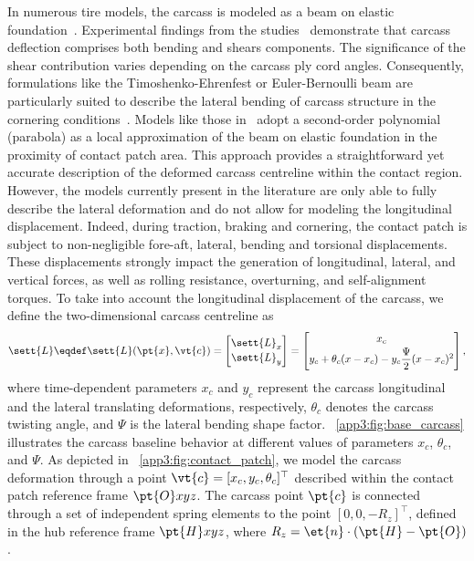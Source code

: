 In numerous tire models, the carcass is modeled as a beam on elastic foundation~\cite{dehoogh2005implementing, sarkisov2019physical, gil2020inplane, nakajima2019advanced}. Experimental findings from the studies~\cite{sarkisov2019physical, gil2020inplane} demonstrate that carcass deflection comprises both bending and shears components. The significance of the shear contribution varies depending on the carcass ply cord angles. Consequently, formulations like the Timoshenko-Ehrenfest or Euler-Bernoulli beam are particularly suited to describe the lateral bending of carcass structure in the cornering conditions~\cite{gil2020inplane}. Models like those in~\cite{fiala1954seitenkraften, miyashita2006new, kabe2006new, xu2014analytical, gil2020inplane, sakai1981theoreticalI, sakai1981theoreticalII, sakai1981theoreticalIII, sakai1982theoreticalIV, miyashita2010tire, fevrier2013method} adopt a second-order polynomial (parabola) as a local approximation of the beam on elastic foundation in the proximity of contact patch area. This approach provides a straightforward yet accurate description of the deformed carcass centreline within the contact region. However, the models currently present in the literature are only able to fully describe the lateral deformation and do not allow for modeling the longitudinal displacement. Indeed, during traction, braking and cornering, the contact patch is subject to non-negligible fore-aft, lateral, bending and torsional displacements. These displacements strongly impact the generation of longitudinal, lateral, and vertical forces, as well as rolling resistance, overturning, and self-alignment torques. To take into account the longitudinal displacement of the carcass, we define the two-dimensional carcass centreline as
%
\begin{equation}
  \sett{L} \eqdef \sett{L}(\pt{x}, \vt{c}) =
  \begin{bmatrix}
    \sett{L}_x \\[0.2em]
    \sett{L}_y
  \end{bmatrix} =
  \begin{bmatrix}
    x_c \\[0.2em]
    y_c + \theta_c(x-x_c) - y_c\dfrac{\Psi}{2}(x-x_c)^2
  \end{bmatrix},
  \label{app3:eq:parabola}
\end{equation}
%
where time-dependent parameters $x_c$ and $y_c$ represent the carcass longitudinal and the lateral translating deformations, respectively, $\theta_c$ denotes the carcass twisting angle, and $\Psi$ is the lateral bending shape factor. \figurename~\ref{app3:fig:base_carcass} illustrates the carcass baseline behavior at different values of parameters $x_c$, $\theta_c$, and $\Psi$. As depicted in \figurename~\ref{app3:fig:contact_patch}, we model the carcass deformation through a point $\vt{c} = [x_c, y_c, \theta_c]^\top$ described within the contact patch reference frame $\pt{O}xyz$. The carcass point $\pt{c}$ is connected through a set of independent spring elements to the point $\left[0, 0, -R_z\right]^\top$, defined in the hub reference frame $\pt{H}xyz$, where $R_z = \et{n} \cdot (\pt{H}-\pt{O})$.

